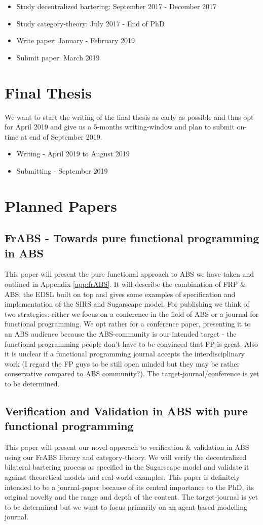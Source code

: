 \begin{itemize}
	\item Study decentralized bartering: September 2017 - December 2017
	\item Study category-theory: July 2017 - End of PhD
	\item Write paper: January - February 2019
	\item Submit paper: March 2019
\end{itemize}

\section{Final Thesis}
We want to start the writing of the final thesis as early as possible and thus opt for April 2019 and give us a 5-months writing-window and plan to submit on-time at end of September 2019.

\begin{itemize}
\item Writing - April 2019 to August 2019
\item Submitting - September 2019
\end{itemize}

\section{Planned Papers}
\subsection{FrABS - Towards pure functional programming in ABS}
This paper will present the pure functional approach to ABS we have taken and outlined in Appendix \ref{app:frABS}. It will describe the combination of FRP \& ABS, the EDSL built on top and gives some examples of specification and implementation of the SIRS and Sugarscape model. 
For publishing we think of two strategies: either we focus on a conference in the field of ABS or a journal for functional programming. We opt rather for a conference paper, presenting it to an ABS audience because the ABS-community is our intended target - the functional programming people don't have to be convinced that FP is great. Also it is unclear if a functional programming journal accepts the interdisciplinary work (I regard the FP guys to be still open minded but they may be rather conservative compared to ABS community?). The target-journal/conference is yet to be determined.

\subsection{Verification and Validation in ABS with pure functional programming}
This paper will present our novel approach to verification \& validation in ABS using our FrABS library and category-theory. We will verify the decentralized bilateral bartering process as specified in the Sugarscape model and validate it against theoretical models and real-world examples. This paper is definitely intended to be a journal-paper because of its central importance to the PhD, its original novelty and the range and depth of the content. The target-journal is yet to be determined but we want to focus primarily on an agent-based modelling journal.

